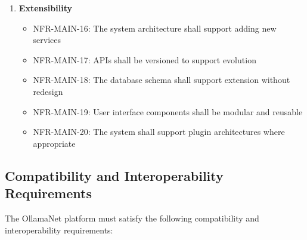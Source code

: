 \begin{enumerate}
   \item \textbf{Extensibility}
   \begin{itemize}
      \item NFR-MAIN-16: The system architecture shall support adding new services
      \item NFR-MAIN-17: APIs shall be versioned to support evolution
      \item NFR-MAIN-18: The database schema shall support extension without redesign
      \item NFR-MAIN-19: User interface components shall be modular and reusable
      \item NFR-MAIN-20: The system shall support plugin architectures where appropriate
   \end{itemize}
\end{enumerate}

\subsection{Compatibility and Interoperability Requirements}

The OllamaNet platform must satisfy the following compatibility and interoperability requirements:

